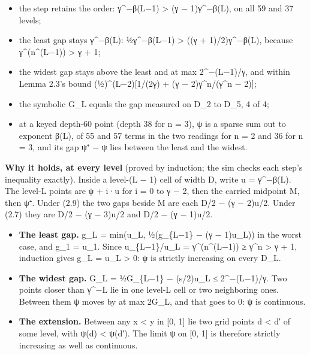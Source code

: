 \begin{enumerate}
\begin{itemize}
\item the step retains the order: γ\textasciicircum{}−β(L−1) > (γ − 1)γ\textasciicircum{}−β(L), on all 59 and 37 levels;
\item the least gap stays γ\textasciicircum{}−β(L): ½γ\textasciicircum{}−β(L−1) > ((γ + 1)/2)γ\textasciicircum{}−β(L), because γ\textasciicircum{}(n\textasciicircum{}(L−1)) > γ + 1;
\item the widest gap stays above the least and at max 2\textasciicircum{}−(L−1)/γ, and within Lemma 2.3's bound (½)\textasciicircum{}(L−2)[1/(2γ) + (γ − 2)γ\textasciicircum{}n/(γ\textasciicircum{}n − 2)];
\item the symbolic G\_\allowbreak{}L equals the gap measured on D\_\allowbreak{}2 to D\_\allowbreak{}5, 4 of 4;
\item at a keyed depth-60 point (depth 38 for n = 3), ψ is a sparse sum out to exponent β(L), of 55 and 57 terms in the two readings for n = 2 and 36 for n = 3, and its gap ψ⁺ − ψ lies between the least and the widest.
\end{itemize}
\end{enumerate}

\textbf{Why it holds, at every level} (proved by induction; the sim checks each step's inequality exactly). Inside a level-(L − 1) cell of width D, write u = γ\textasciicircum{}−β(L). The level-L points are ψ + i·u for i = 0 to γ − 2, then the carried midpoint M, then ψ⁺. Under (2.9) the two gaps beside M are each D/2 − (γ − 2)u/2. Under (2.7) they are D/2 − (γ − 3)u/2 and D/2 − (γ − 1)u/2.

\begin{itemize}
\item \textbf{The least gap.} g\_\allowbreak{}L = min(u\_\allowbreak{}L, ½(g\_\allowbreak{}\{L−1\} − (γ − 1)u\_\allowbreak{}L)) in the worst case, and g\_\allowbreak{}1 = u\_\allowbreak{}1. Since u\_\allowbreak{}\{L−1\}/u\_\allowbreak{}L = γ\textasciicircum{}(n\textasciicircum{}(L−1)) ≥ γ\textasciicircum{}n > γ + 1, induction gives g\_\allowbreak{}L = u\_\allowbreak{}L > 0: ψ is strictly increasing on every D\_\allowbreak{}L.
\item \textbf{The widest gap.} G\_\allowbreak{}L = ½G\_\allowbreak{}\{L−1\} − (s/2)u\_\allowbreak{}L ≤ 2\textasciicircum{}−(L−1)/γ. Two points closer than γ\textasciicircum{}−L lie in one level-L cell or two neighboring ones. Between them ψ moves by at max 2G\_\allowbreak{}L, and that goes to 0: ψ is continuous.
\item \textbf{The extension.} Between any x < y in [0, 1] lie two grid points d < d′ of some level, with ψ(d) < ψ(d′). The limit ψ on [0, 1] is therefore strictly increasing as well as continuous.
\end{itemize}

